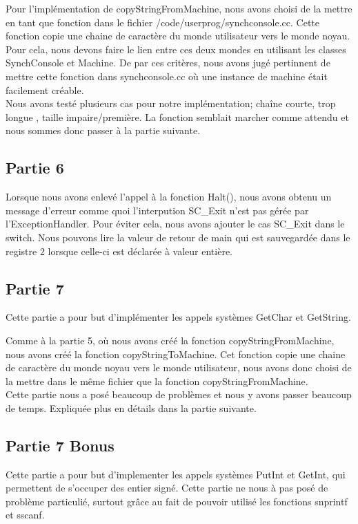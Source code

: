 \documentclass[a4paper]{article}
\begin{document}
Pour l'implémentation de copyStringFromMachine, nous avons choisi de la mettre
en tant que fonction dans le fichier /code/userprog/synchconsole.cc. Cette fonction
copie une chaine de caractère du monde utilisateur vers le monde noyau. Pour cela,
nous devons faire le lien entre ces deux mondes en utilisant les classes SynchConsole
et Machine. De par ces critères, nous avons jugé pertinnent de mettre cette fonction
dans synchconsole.cc où une instance de machine était facilement créable. \\

Nous avons testé plusieurs cas pour notre implémentation; chaîne courte, trop longue
, taille impaire/première. La fonction semblait marcher comme attendu et nous sommes
donc passer à la partie suivante.

\subsection{Partie 6}
Lorsque nous avons enlevé l'appel à la fonction Halt(), nous avons obtenu
un message d'erreur comme quoi l'interpution SC\_Exit n'est pas gérée par
l'ExceptionHandler. Pour éviter cela, nous avons ajouter le cas SC\_Exit dans le
switch. Nous pouvons lire la valeur de retour de main qui est sauvegardée dans
le registre 2 lorsque celle-ci est déclarée à valeur entière.

\subsection{Partie 7}
Cette partie a pour but d'implémenter les appels systèmes GetChar et GetString.

Comme à la partie 5, où nous avons créé la fonction copyStringFromMachine, nous
avons créé la fonction copyStringToMachine. Cet fonction copie une chaine de
caractère du monde noyau vers le monde utilisateur, nous avons donc choisi de la
mettre dans le même fichier que la fonction copyStringFromMachine.\\

Cette partie nous a posé beaucoup de problèmes et nous y avons passer beaucoup de
temps. Expliquée plus en détails dans la partie suivante.

\subsection{Partie 7 Bonus}

Cette partie a pour but d'implementer les appels systèmes PutInt et GetInt, qui
permettent de s'occuper des entier signé. Cette partie ne nous à pas posé de
problème particulié, surtout grâce au fait de pouvoir utilisé les fonctions snprintf
et sscanf.
\end{document}
